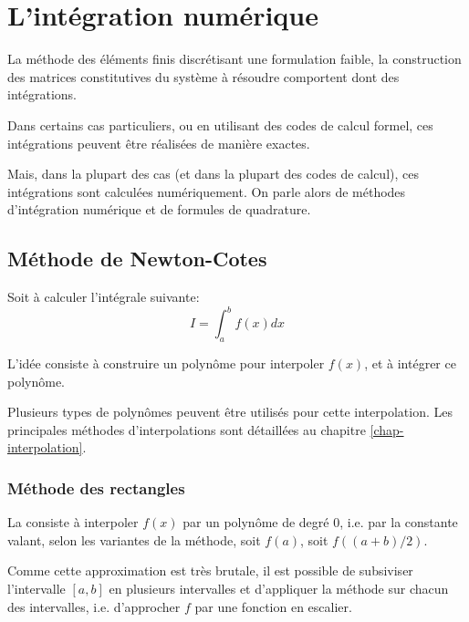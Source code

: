 \chapter{L'intégration numérique}\label{chap-quadrature}

La méthode des éléments finis discrétisant une formulation faible,  la construction des matrices 
constitutives du système à  résoudre comportent dont des intégrations.

Dans certains cas particuliers, ou en utilisant des codes de calcul formel, ces intégrations
peuvent être réalisées de manière exactes.

Mais, dans la plupart des cas (et dans la plupart des codes de calcul), ces
intégrations sont calculées numériquement. On parle alors de méthodes
d'intégration numérique et de formules de quadrature.






\medskip
\section{Méthode de Newton-Cotes}

Soit à calculer l'intégrale suivante:
\begin{equation}I=\int_a^b f(x)dx\end{equation}

\medskip
L'idée consiste à construire un polynôme pour interpoler $f(x)$, et
à intégrer ce polynôme.

\medskip
Plusieurs types de polynômes peuvent être utilisés pour cette interpolation.
Les principales méthodes d'interpolations sont détaillées au chapitre \ref{chap-interpolation}.



\medskip
\subsection*{Méthode des rectangles}

La  consiste à interpoler $f(x)$ par un
polynôme de degré $0$, i.e. par la constante valant, selon les variantes de la
méthode, soit $f(a)$, soit $f((a+b)/2)$.

\medskip
Comme cette approximation est très brutale, il est possible de subsiviser
l'intervalle $[a,b]$ en plusieurs intervalles et d'appliquer la méthode sur chacun
des intervalles, i.e. d'approcher $f$ par une fonction en escalier.

